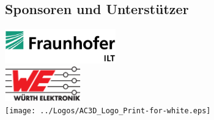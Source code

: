 \documentclass[a4paper,12pt,notumble]{leaflet}
\begin{document}
\noindent
\begin{minipage}[c][0.32\textheight][t]{\textwidth}
	\begin{center}
		\section{Sponsoren und Unterstützer}
		\vspace{0.7cm}
		\includegraphics[height=1.5cm]{../Logos/Fraunhofer_ILT_klein.png} \\ \vspace{0.5cm}
		\includegraphics[height=1.5cm]{../Logos/Wuerth.png} \\ \vspace{0.5cm}
		\texttt{[image: ../Logos/AC3D\_Logo\_Print-for-white.eps]} \\ \vspace{0.5cm}
	\end{center}
\end{minipage}
\end{document}
